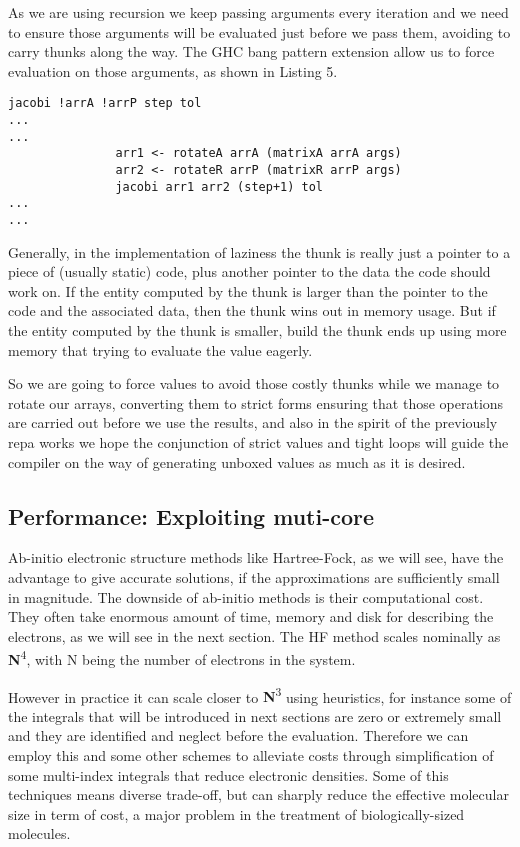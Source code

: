 \documentclass{tmr}
\begin{document}
As we are using recursion we keep passing arguments every iteration and we need to ensure those arguments will be evaluated just before 
we pass them, avoiding to carry thunks along the way. The GHC bang pattern extension allow us to force evaluation on those arguments, as shown
in Listing 5.

\begin{lstlisting}[float,captionpos=b,belowcaptionskip=4pt, caption= Jacobi strict argument passing]
jacobi !arrA !arrP step tol
...
...
               arr1 <- rotateA arrA (matrixA arrA args)
               arr2 <- rotateR arrP (matrixR arrP args)
               jacobi arr1 arr2 (step+1) tol
...
...
\end{lstlisting}

Generally, in the implementation of laziness the thunk is really just a pointer to a piece of (usually static) code, plus another pointer 
to the data the code should work on. If the entity computed by the thunk is larger than the pointer to the code and the associated 
data, then the thunk wins out in memory usage. But if the entity computed by the thunk is smaller, build the thunk ends up using 
more memory that trying to evaluate the value eagerly.

So we are going to force values to avoid those costly thunks while we manage to rotate our arrays, 
converting them to strict forms ensuring that those operations are carried out before we use the results,
and also in the spirit of the previously repa works we hope the conjunction of strict values 
and tight loops will guide the compiler on the way of generating unboxed values as much as it is desired.

\subsection{Performance: Exploiting muti-core}

Ab-initio electronic structure methods like Hartree-Fock, as we will see,
 have the advantage to give accurate solutions, if the approximations 
are sufficiently small in magnitude. The downside of ab-initio methods
 is their computational cost. They often take enormous amount of time, 
memory and disk for describing the electrons, as we will see in the next section. The HF method scales nominally 
as {\textbf N\textsuperscript{4}}, with N being the number of electrons in the system. 


However in practice it can scale closer to {\textbf N\textsuperscript{3}} using heuristics,
for instance some of the integrals that will be introduced in next sections are zero or extremely
small and they are identified and neglect before the evaluation. Therefore we can employ this and some other
schemes to alleviate costs through simplification of some multi-index integrals that reduce electronic densities. 
Some of this techniques means diverse trade-off, but can sharply reduce the effective molecular size
in term of cost, a major problem in the treatment of biologically-sized molecules.
\end{document}
